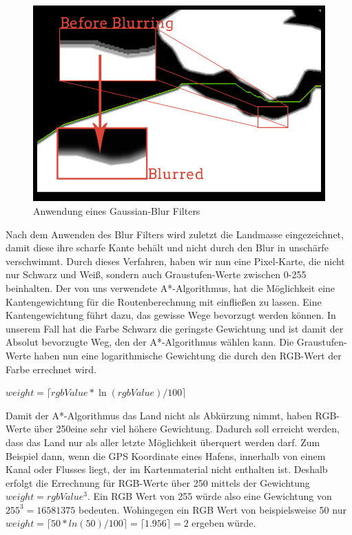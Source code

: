 \documentclass[letterpaper]{article}
\begin{document}
		\begin{figure}[!htbp]
			\centering
			\includegraphics[width=\linewidth]{blur_effect}
			\caption{Anwendung eines Gaussian-Blur Filters}
			\label{fig:blur effect}
		\end{figure}

		Nach dem Anwenden des Blur Filters wird zuletzt die Landmasse eingezeichnet, damit diese ihre scharfe Kante behält und nicht durch den Blur in unschärfe verschwimmt. 
		Durch dieses Verfahren, haben wir nun eine Pixel-Karte, die nicht nur Schwarz und Weiß, sondern auch Graustufen-Werte zwischen 0-255 beinhalten. Der von uns verwendete A*-Algorithmus\cite{ginstead14}, hat die Möglichkeit eine Kantengewichtung für die Routenberechnung mit einfließen zu lassen. Eine Kantengewichtung führt dazu, das gewisse Wege bevorzugt werden können. In unserem Fall hat die Farbe Schwarz die geringste Gewichtung und ist damit der Absolut bevorzugte Weg, den der A*-Algorithmus wählen kann. Die Graustufen-Werte haben nun eine logarithmische Gewichtung die durch den RGB-Wert der Farbe errechnet wird.

		$weight = \lceil rgbValue * \ln{(rgbValue)/100} \rceil$

		Damit der A*-Algorithmus das Land nicht als Abkürzung nimmt, haben RGB-Werte über 250\footnotemark eine sehr viel höhere Gewichtung. Dadurch soll erreicht werden, dass das Land nur als aller letzte Möglichkeit überquert werden darf. Zum Beispiel dann, wenn die GPS Koordinate eines Hafens, innerhalb von einem Kanal oder Flusses liegt, der im Kartenmaterial nicht enthalten ist. Deshalb erfolgt die Errechnung für RGB-Werte über 250 mittels der Gewichtung $weight = rgbValue^3$. Ein RGB Wert von 255 würde also eine Gewichtung von $255^3 = 16581375$ bedeuten. Wohingegen ein RGB Wert von beispielsweise 50 nur $ weight = \lceil 50 * ln(50)/100 \rceil = \lceil 1.956 \rceil = 2 $ ergeben würde.\\
\end{document}
